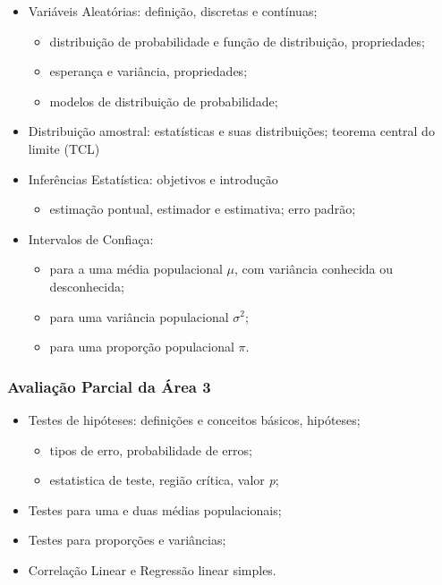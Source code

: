 \documentclass[
]{article}
\providecommand{\tightlist}{%
  \setlength{\itemsep}{0pt}\setlength{\parskip}{0pt}}
\begin{document}
\begin{itemize}
\tightlist
\item
  Variáveis Aleatórias: definição, discretas e contínuas;

  \begin{itemize}
  \tightlist
  \item
    distribuição de probabilidade e função de distribuição,
    propriedades;
  \item
    esperança e variância, propriedades;
  \item
    modelos de distribuição de probabilidade;
  \end{itemize}
\item
  Distribuição amostral: estatísticas e suas distribuições; teorema
  central do limite (TCL)
\item
  Inferências Estatística: objetivos e introdução

  \begin{itemize}
  \tightlist
  \item
    estimação pontual, estimador e estimativa; erro padrão;
  \end{itemize}
\item
  Intervalos de Confiaça:

  \begin{itemize}
  \tightlist
  \item
    para a uma média populacional \(\mu\), com variância conhecida ou
    desconhecida;
  \item
    para uma variância populacional \(\sigma^2\);
  \item
    para uma proporção populacional \(\pi\).
  \end{itemize}
\end{itemize}

\vspace{1.0cm}

\hypertarget{avaliauxe7uxe3o-parcial-da-uxe1rea-3}{%
\subsubsection{Avaliação Parcial da Área
3}\label{avaliauxe7uxe3o-parcial-da-uxe1rea-3}}

\begin{itemize}
\tightlist
\item
  Testes de hipóteses: definições e conceitos básicos, hipóteses;

  \begin{itemize}
  \tightlist
  \item
    tipos de erro, probabilidade de erros;
  \item
    estatistica de teste, região crítica, valor \emph{p};
  \end{itemize}
\item
  Testes para uma e duas médias populacionais;
\item
  Testes para proporções e variâncias;
\item
  Correlação Linear e Regressão linear simples.
\end{itemize}
\end{document}
